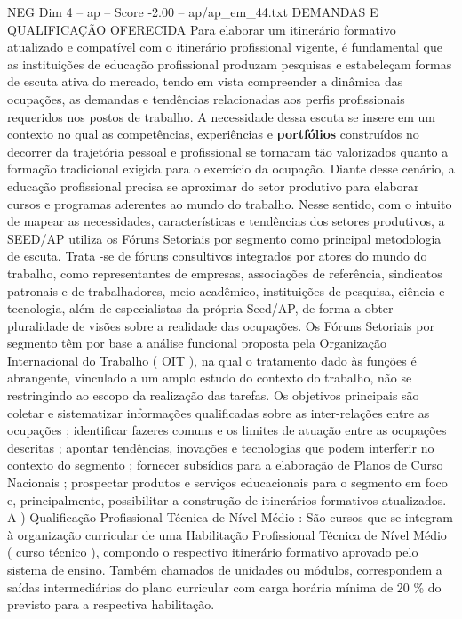 \begin{textsample}{NEG Dim 4 – ap – Score -2.00 – ap/ap\_em\_44.txt}  \label{ex:f4_neg_056}
DEMANDAS E QUALIFICAÇÃO OFERECIDA Para elaborar um itinerário formativo atualizado e compatível com o itinerário profissional vigente, é fundamental que as instituições de educação profissional produzam pesquisas e estabeleçam formas de escuta ativa do mercado, tendo em vista compreender a dinâmica das ocupações, as demandas e tendências relacionadas aos perfis profissionais requeridos nos postos de trabalho.
A necessidade dessa escuta se insere em um contexto no qual as competências, experiências e \textbf{portfólios} construídos no decorrer da trajetória pessoal e profissional se tornaram tão valorizados quanto a formação tradicional exigida para o exercício da ocupação.
Diante desse cenário, a educação profissional precisa se aproximar do setor produtivo para elaborar cursos e programas aderentes ao mundo do trabalho.
Nesse sentido, com o intuito de mapear as necessidades, características e tendências dos setores produtivos, a SEED/AP utiliza os Fóruns Setoriais por segmento como principal metodologia de escuta.
Trata -se de fóruns consultivos integrados por atores do mundo do trabalho, como representantes de empresas, associações de referência, sindicatos patronais e de trabalhadores, meio acadêmico, instituições de pesquisa, ciência e tecnologia, além de especialistas da própria Seed/AP, de forma a obter pluralidade de visões sobre a realidade das ocupações.
Os Fóruns Setoriais por segmento têm por base a análise funcional proposta pela Organização Internacional do Trabalho ( OIT ), na qual o tratamento dado às funções é abrangente, vinculado a um amplo estudo do contexto do trabalho, não se restringindo ao escopo da realização das tarefas.
Os objetivos principais são coletar e sistematizar informações qualificadas sobre as inter-relações entre as ocupações ; identificar fazeres comuns e os limites de atuação entre as ocupações descritas ; apontar tendências, inovações e tecnologias que podem interferir no contexto do segmento ; fornecer subsídios para a elaboração de Planos de Curso Nacionais ; prospectar produtos e serviços educacionais para o segmento em foco e, principalmente, possibilitar a construção de itinerários formativos atualizados.
A ) Qualificação Profissional Técnica de Nível Médio : São cursos que se integram à organização curricular de uma Habilitação Profissional Técnica de Nível Médio ( curso técnico ), compondo o respectivo itinerário formativo aprovado pelo sistema de ensino.
Também chamados de unidades ou módulos, correspondem a saídas intermediárias do plano curricular com carga horária mínima de 20 \% do previsto para a respectiva habilitação.

\end{textsample}
